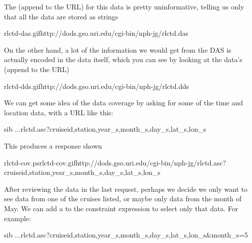 \documentclass{dods-book}
\begin{document}
The 
(append  to the URL) for this data is pretty uninformative,
telling us only that all the data are stored as strings

%
{rlctd-das.gif}{http://dods.gso.uri.edu/cgi-bin/nph-jg/rlctd.das}

On the other hand, a lot of the information we would get from the DAS
is actually encoded in the data itself, which you can see by looking
at the data's
 (append
 to the URL)

%
{rlctd-dds.gif}{http://dods.gso.uri.edu/cgi-bin/nph-jg/rlctd.dds}

We can get some idea of the data coverage by asking for some of the
time and location data, with a URL like this:

\begin{vcode}{sib}
...rlctd.asc?cruiseid,station,year_s,month_s,day_s,lat_s,lon_s
\end{vcode}

This produces a response shown 

{rlctd-cov.ps}{rlctd-cov.gif}{http://dods.gso.uri.edu/cgi-bin/nph-jg/rlctd.asc?cruiseid,station,year_s,month_s,day_s,lat_s,lon_s}


After reviewing the data in the last request, perhaps we decide we
only want to see data from one of the cruises listed, or maybe only
data from the month of May.  We can add a  to
the constraint expression to select only that data.  For example:

\begin{vcode}[http://dods.gso.uri.edu/cgi-bin/nph-jg/rlctd.asc?cruiseid,station,year_s,month_s,day_s,lat_s,lon_s&month_s=5]{sib}
...rlctd.asc?cruiseid,station,year_s,month_s,day_s,lat_s,lon_s&month_s=5
\end{vcode}
\end{document}
